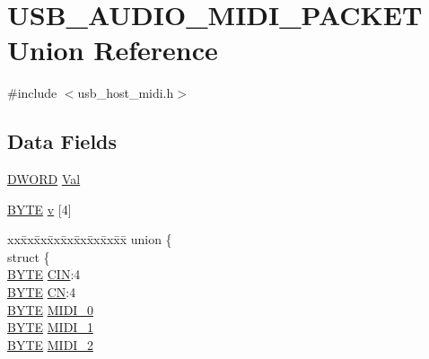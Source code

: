 \hypertarget{union_u_s_b___a_u_d_i_o___m_i_d_i___p_a_c_k_e_t}{}\section{U\+S\+B\+\_\+\+A\+U\+D\+I\+O\+\_\+\+M\+I\+D\+I\+\_\+\+P\+A\+C\+K\+E\+T Union Reference}
\label{union_u_s_b___a_u_d_i_o___m_i_d_i___p_a_c_k_e_t}


{\ttfamily \#include $<$usb\+\_\+host\+\_\+midi.\+h$>$}

\subsection*{Data Fields}
\begin{DoxyCompactItemize}
\item 
\hyperlink{_generic_type_defs_8h_ad342ac907eb044443153a22f964bf0af}{D\+W\+O\+R\+D} \hyperlink{union_u_s_b___a_u_d_i_o___m_i_d_i___p_a_c_k_e_t_a1a2aefd22f32fe19c7a40fd62958b591}{Val}
\item 
\hyperlink{_generic_type_defs_8h_a4ae1dab0fb4b072a66584546209e7d58}{B\+Y\+T\+E} \hyperlink{union_u_s_b___a_u_d_i_o___m_i_d_i___p_a_c_k_e_t_a6a8b1b6abca9b51faec40b33d22aed79}{v} \mbox{[}4\mbox{]}
\item 
\begin{tabbing}
xx\=xx\=xx\=xx\=xx\=xx\=xx\=xx\=xx\=\kill
union \{\\
\>struct \{\\
\>\>\hyperlink{_generic_type_defs_8h_a4ae1dab0fb4b072a66584546209e7d58}{BYTE} \hyperlink{union_u_s_b___a_u_d_i_o___m_i_d_i___p_a_c_k_e_t_af67e93529dc4f3139921459486e2e758}{CIN}:4\\
\>\>\hyperlink{_generic_type_defs_8h_a4ae1dab0fb4b072a66584546209e7d58}{BYTE} \hyperlink{union_u_s_b___a_u_d_i_o___m_i_d_i___p_a_c_k_e_t_a41dd3c816e4d33fcb7d2a09a0cdb6cbb}{CN}:4\\
\>\>\hyperlink{_generic_type_defs_8h_a4ae1dab0fb4b072a66584546209e7d58}{BYTE} \hyperlink{union_u_s_b___a_u_d_i_o___m_i_d_i___p_a_c_k_e_t_ab0865a19f9470a058eaeec3399222c5a}{MIDI\_0}\\
\>\>\hyperlink{_generic_type_defs_8h_a4ae1dab0fb4b072a66584546209e7d58}{BYTE} \hyperlink{union_u_s_b___a_u_d_i_o___m_i_d_i___p_a_c_k_e_t_ae794c1f500754e20617d039ceb2c5891}{MIDI\_1}\\
\>\>\hyperlink{_generic_type_defs_8h_a4ae1dab0fb4b072a66584546209e7d58}{BYTE} \hyperlink{union_u_s_b___a_u_d_i_o___m_i_d_i___p_a_c_k_e_t_a39e3944f07fa87426fb9687f22e268d3}{MIDI\_2}\\

\end{tabbing}
\end{DoxyCompactItemize}
